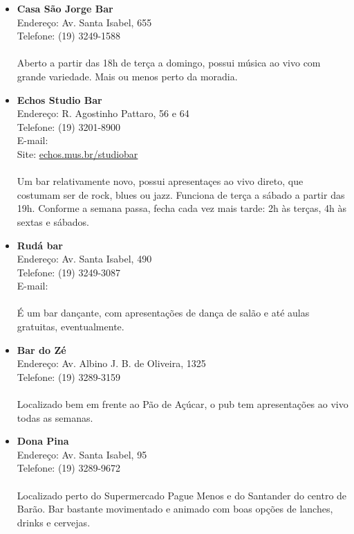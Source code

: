 \begin{itemize}
\item \textbf{Casa São Jorge Bar}
  \\Endereço: Av. Santa Isabel, 655
  \\Telefone: (19) 3249-1588
  \\
  \\Aberto a partir das 18h de terça a domingo, possui música ao vivo com
  grande variedade. Mais ou menos perto da moradia.

\item \textbf{Echos Studio Bar}
  \\Endereço: R. Agostinho Pattaro, 56 e 64
  \\Telefone: (19) 3201-8900
  \\E-mail: 
  \\Site: \url{echos.mus.br/studiobar}
  \\
  \\Um bar relativamente novo, possui apresentaçes ao vivo direto, que costumam
  ser de rock, blues ou jazz. Funciona de terça a sábado a partir das 19h.
  Conforme a semana passa, fecha cada vez mais tarde: 2h às terças, 4h às
  sextas e sábados.

\item \textbf{Rudá bar}
  \\Endereço: Av. Santa Isabel, 490
  \\Telefone: (19) 3249-3087
  \\E-mail: 
  \\
  \\É um bar dançante, com apresentações de dança de salão e até aulas
  gratuitas, eventualmente.

\item \textbf{Bar do Zé}
  \\Endereço: Av. Albino J. B. de Oliveira, 1325
  \\Telefone: (19) 3289-3159
  \\
  \\Localizado bem em frente ao Pão de Açúcar, o pub tem apresentações ao vivo
  todas as semanas.

\item \textbf{Dona Pina}
  \\Endereço: Av. Santa Isabel, 95
  \\Telefone: (19) 3289-9672
  \\
  \\Localizado perto do Supermercado Pague Menos e do Santander do centro de
  Barão. Bar bastante movimentado e animado com boas opções de lanches, drinks
  e cervejas.
\end{itemize}


